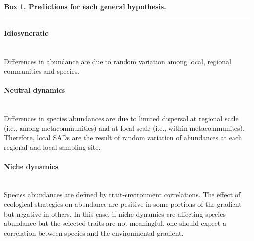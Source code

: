\documentclass[12pt]{article}
\begin{document}
\begin{mdframed}[style=exampledefault]
\newpage
\begin{singlespacing}
 \textbf{Box 1. Predictions for each general hypothesis.} \\
 \noindent\rule[0.5ex]{\linewidth}{1pt}
  \paragraph{{\color{grey}{$\blacksquare$}} Idiosyncratic} ~\\ Differences in abundance are due to random variation among local, regional communities and species.
\paragraph{{\color{neutral}{$\blacksquare$}} Neutral dynamics} ~\\ Differences in species abundances are due to limited dispersal at regional scale (i.e., among metacommunities) and at local scale (i.e., within metacommunites). Therefore, local SADs are the result of random variation of abundances at each regional and local sampling site. %
\paragraph{{\color{niche}{$\blacksquare$}} Niche dynamics } ~\\ Species abundances are defined by trait-environment correlations. The effect of ecological strategies on abundance are positive in some portions of the gradient but negative in others. In this case, if niche dynamics are affecting species abundance but the selected traits are not meaningful, one should expect a correlation between species and the environmental gradient.  

\end{singlespacing}
\end{mdframed}
\end{document}
